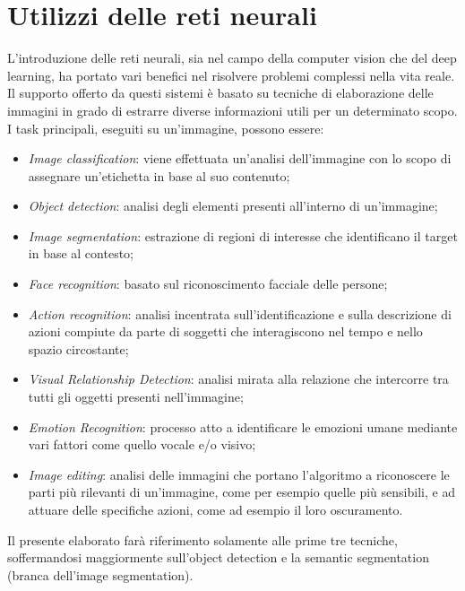 \section{Utilizzi delle reti neurali}
L'introduzione delle reti neurali, sia nel campo della computer vision che 
del deep learning, ha portato vari benefici nel risolvere problemi complessi 
nella vita reale. Il supporto offerto da questi sistemi è basato su tecniche 
di elaborazione delle immagini in grado di estrarre diverse informazioni 
utili per un determinato scopo. I task principali, eseguiti su un'immagine, 
possono essere:
\begin{itemize}
    \item \emph{Image classification}: viene effettuata un'analisi dell'immagine con lo 
    scopo di assegnare un'etichetta in base al suo contenuto;
    \item \emph{Object detection}: analisi degli elementi presenti all'interno di un'immagine;
    \item \emph{Image segmentation}: estrazione di regioni di interesse che identificano 
    il target in base al contesto;
    \item \emph{Face recognition}: basato sul riconoscimento facciale delle persone;
    \item \emph{Action recognition}: analisi incentrata sull'identificazione e sulla descrizione 
    di azioni compiute da parte di soggetti che interagiscono nel 
    tempo e nello spazio circostante;
    \item \emph{Visual Relationship Detection}: analisi mirata alla relazione che intercorre 
    tra tutti gli oggetti presenti nell'immagine;
    \item \emph{Emotion Recognition}: processo atto a identificare le emozioni umane 
    mediante vari fattori come quello vocale e/o visivo;
    \item \emph{Image editing}: analisi delle immagini che portano l'algoritmo a riconoscere 
    le parti più rilevanti di un'immagine, come per esempio quelle 
    più sensibili, e ad attuare delle specifiche azioni, come ad esempio il 
    loro oscuramento.
\end{itemize}
Il presente elaborato farà riferimento solamente alle prime tre tecniche, 
soffermandosi maggiormente sull'object detection e la semantic segmentation 
(branca dell'image segmentation).

